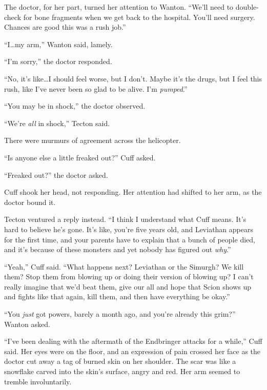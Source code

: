 The doctor, for her part, turned her attention to Wanton.  ``We'll need to double-check for bone fragments when we get back to the hospital.  You'll need surgery.  Chances are good this was a rush job.''



``I\ldots my arm,'' Wanton said, lamely.



``I'm sorry,'' the doctor responded.



``No, it's like\ldots I should feel worse, but I don't.  Maybe it's the drugs, but I feel this rush, like I've never been so glad to be alive.  I'm \emph{pumped}.''



``You may be in shock,'' the doctor observed.



``We're \emph{all} in shock,'' Tecton said.



There were murmurs of agreement across the helicopter.



``Is anyone else a little freaked out?'' Cuff asked.



``Freaked out?'' the doctor asked.



Cuff shook her head, not responding.  Her attention had shifted to her arm, as the doctor bound it.



Tecton ventured a reply instead.  ``I think I understand what Cuff means.  It's hard to believe he's gone.  It's like, you're five years old, and Leviathan appears for the first time, and your parents have to explain that a bunch of people died, and it's because of these monsters and yet nobody has figured out \emph{why}.''



``Yeah,'' Cuff said.  ``What happens next?  Leviathan or the Simurgh?  We kill them?  Stop them from blowing up or doing their version of blowing up?  I can't really imagine that we'd beat them, give our all and hope that Scion shows up and fights like that again, kill them, and then have everything be okay.''



``You \emph{just }got powers, barely a month ago, and you're already this grim?'' Wanton asked.



``I've been dealing with the aftermath of the Endbringer attacks for a while,'' Cuff said.  Her eyes were on the floor, and an expression of pain crossed her face as the doctor cut away a tag of burned skin on her shoulder.  The scar was like a snowflake carved into the skin's surface, angry and red.  Her arm seemed to tremble involuntarily.



